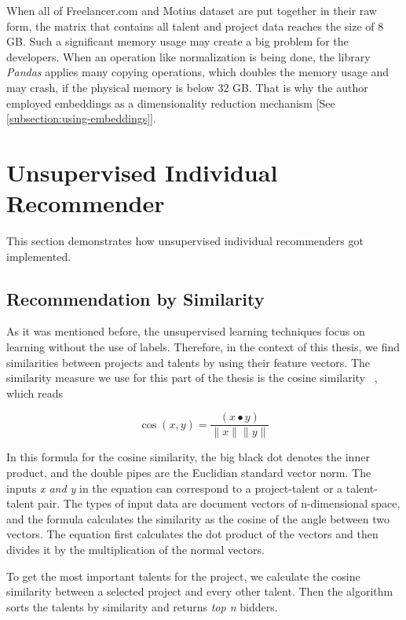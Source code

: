 When all of Freelancer.com and Motius dataset are put together in their raw form, the matrix that contains all talent and project data reaches the size of 8 GB. Such a significant memory usage may create a big problem for the developers. When an operation like normalization is being done, the library \textit{Pandas} applies many copying operations, which doubles the memory usage and may crash, if the physical memory is below 32 GB. That is why the author employed embeddings as a dimensionality reduction mechanism [See \ref{subsection:using-embeddings}].




\section{Unsupervised Individual Recommender}\label{implementation-unsupervised-individual}

This section demonstrates how unsupervised individual recommenders got implemented.

\subsection{Recommendation by Similarity}\label{implementation-unsupervised-similarity}

As it was mentioned before, the unsupervised learning techniques focus on learning without the use of labels. Therefore, in the context of this thesis, we find similarities between projects and talents by using their feature vectors. The similarity measure we use for this part of the thesis is the cosine similarity ~\parencite{amatriain2011data}, which reads



\begin{equation}
\cos (x, y)=\frac{(x \bullet y)}{\|x\|\|y\|}
\end{equation}


In this formula for the cosine similarity, the big black dot denotes the inner product, and the double pipes are the Euclidian standard vector norm. The inputs  \textit{x and y} in the equation can correspond to a project-talent or a talent-talent pair. The types of input data are document vectors of n-dimensional space, and the formula calculates the similarity as the cosine of the angle between two vectors. The equation first calculates the dot product of the vectors and then divides it by the multiplication of the normal vectors.


To get the most important talents for the project, we calculate the cosine similarity between a selected project and every other talent. Then the algorithm sorts the talents by similarity and returns \textit{top n} bidders.



